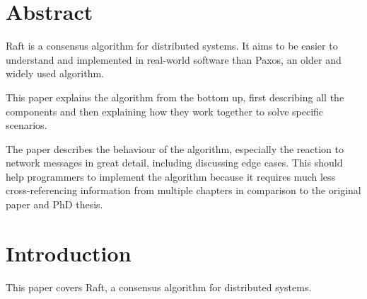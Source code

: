 




\begin{titlepage}
\afterpage{\restorepagecolor}
\newcommand{\colorRule}[3][black]{\textcolor[HTML]{#1}{\rule{#2}{#3}}}
\end{titlepage}
\restoregeometry



{
\hypersetup{linkcolor=}
\setcounter{tocdepth}{3}
\tableofcontents
\pagebreak
}

\section{Abstract}

Raft is a consensus algorithm for distributed systems. It aims to be easier to understand and implemented in real-world software than Paxos, an older and widely used algorithm.

This paper explains the algorithm from the bottom up, first describing all the components and
then explaining how they work together to solve specific scenarios.

The paper describes the behaviour of the algorithm, especially the reaction to network messages
in great detail, including discussing edge cases. This should help programmers to implement
the algorithm because it requires much less cross-referencing information from multiple chapters in
comparison to the original paper and PhD thesis.

\section{Introduction}

This paper covers Raft, a consensus algorithm for distributed systems.

